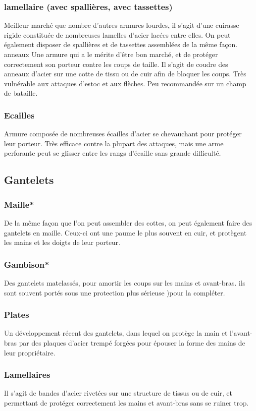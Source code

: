 \documentclass[10pt,a4paper,twocolumn]{book}
\begin{document}
\subsubsection{lamellaire (avec spallières, avec tassettes)}
Meilleur marché que nombre d'autres armures lourdes, il s'agit d'une cuirasse rigide constituée de nombreuses lamelles d'acier lacées entre elles. On peut également disposer de spallières et de tassettes assemblées de la même façon.
anneaux
Une armure qui a le mérite d'être bon marché, et de protéger correctement son porteur contre les coups de taille. Il s'agit de coudre des anneaux d'acier sur une cotte de tissu ou de cuir afin de bloquer les coups. Très vulnérable aux attaques d'estoc et aux flèches. Peu recommandée sur un champ de bataille.
\subsubsection{Ecailles}
Armure composée de nombreuses écailles d'acier se chevauchant pour protéger leur porteur. Très efficace contre la plupart des attaques, mais une arme perforante peut se glisser entre les rangs d'écaille sans grande difficulté.
\subsection{Gantelets}
\subsubsection{Maille*}
De la même façon que l'on peut assembler des cottes, on peut également faire des gantelets en maille. Ceux-ci ont une paume le plus souvent en cuir, et protègent les mains et les doigts de leur porteur.
\subsubsection{Gambison*}
Des gantelets matelassés, pour amortir les coups sur les mains et avant-bras. ils sont souvent portés sous une protection plus sérieuse )pour la compléter.
\subsubsection{Plates}
Un développement récent des gantelets, dans lequel on protège la main et l'avant-bras par des plaques d'acier trempé forgées pour épouser la forme des mains de leur propriétaire.
\subsubsection{Lamellaires}
Il s'agit de bandes d'acier rivetées sur une structure de tissus ou de cuir, et permettant de protéger correctement les mains et avant-bras sans se ruiner trop.
\end{document}
